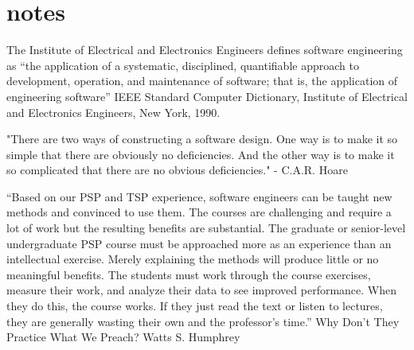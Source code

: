\chapter{notes}

The Institute of Electrical and Electronics Engineers defines software engineering as 
“the application of a systematic, disciplined, quantifiable approach to development, 
operation, and maintenance of software; that is, the application of engineering software”
IEEE Standard Computer Dictionary, Institute
of Electrical and Electronics Engineers, New
York, 1990.

"There are two ways of constructing a software design. One way is to make it so simple 
that there are obviously no deficiencies. And the other way is to make it so complicated that
there are no obvious deficiencies."
- C.A.R. Hoare

``Based on our PSP and TSP experience, software engineers can be taught new methods and
convinced to use them. The courses are challenging and require a lot of work but the 
resulting benefits are substantial. The graduate or senior-level undergraduate PSP 
course must be approached more as an experience than an intellectual exercise. 
Merely explaining the methods will produce little or no meaningful benefits. 
The students must work through the course exercises, measure their work, and 
analyze their data to see improved performance. When they do this, the course works. 
If they just read the text or listen to lectures, they are generally wasting their 
own and the professor's time.''
Why Don't They Practice What We Preach?
Watts S. Humphrey